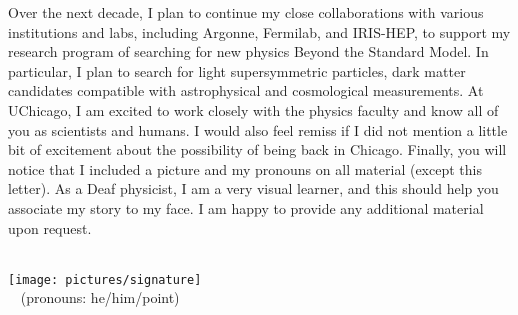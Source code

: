 \documentclass[10pt,letterpaper,sans]{moderncv/moderncv} %
\makeatletter
\renewcommand*{\makeletterclosing}{
  \@closing\\[0.5em]%
  \texttt{[image: pictures/signature]}\\%
  {\bfseries \@firstname~\@lastname} (pronouns: he/him/point)%
  \ifthenelse{\isundefined{\@enclosure}}{}{%
    \\%
    \vfill%
    {\color{color2}\itshape\enclname: \@enclosure}}}
\makeatother
\begin{document}
Over the next decade, I plan to continue my close collaborations with various institutions and labs, including Argonne, Fermilab, and IRIS-HEP, to support my research program of searching for new physics Beyond the Standard Model. In particular, I plan to search for light supersymmetric particles, dark matter candidates compatible with astrophysical and cosmological measurements. At UChicago, I am excited to work closely with the physics faculty and know all of you as scientists and humans. I would also feel remiss if I did not mention a little bit of excitement about the possibility of being back in Chicago. Finally, you will notice that I included a picture and my pronouns on all material (except this letter). As a Deaf physicist, I am a very visual learner, and this should help you associate my story to my face. I am happy to provide any additional material upon request.

\makeletterclosing
\end{document}
